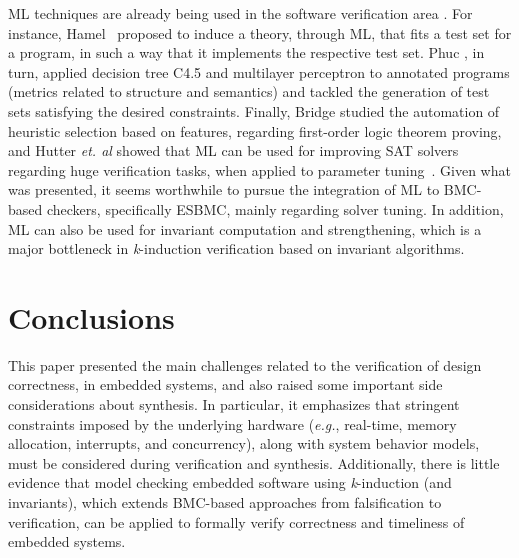 \documentclass[format=acmsmall, review=false, screen=true]{acmart}
\begin{document}
{{ML techniques are already being used in the software verification area \cite{mlswverif,nguyen,bridge,babic07}. For instance, Hamel~\cite{mlswverif} proposed to induce a theory, through ML, that fits a test set for a program, in such a way that it implements the respective test set. Phuc \cite{nguyen}, in turn, applied decision tree C4.5 and multilayer perceptron to annotated programs (metrics related to structure and semantics) and tackled the generation of test sets satisfying the desired constraints. Finally, Bridge studied the automation of heuristic selection based on features, regarding first-order logic theorem proving, and Hutter {\it et. al} \cite{babic07} showed that ML can be used for improving SAT solvers regarding huge verification tasks, when applied to parameter tuning~\cite{babic07}. Given what was presented, it seems worthwhile to pursue the integration of ML to BMC-based checkers, specifically ESBMC, mainly regarding solver tuning. In addition, ML can also be used for invariant computation and strengthening, which is a major bottleneck in \textit{k}-induction verification based on invariant algorithms. 

\section{Conclusions}
\label{conclusions}

This paper presented the main challenges related to the verification of design correctness, in embedded systems, and also raised some important side considerations about synthesis. In particular, it emphasizes that stringent constraints imposed by the underlying hardware ({\it e.g.}, real-time, memory allocation, interrupts, and concurrency), along with system behavior models, must be considered during verification and synthesis. Additionally, there is little evidence that model checking embedded software using \textit{k}-induction (and invariants), which
extends BMC-based approaches from falsification to verification, can be applied to formally verify correctness and timeliness of embedded systems. 

}}
\end{document}
